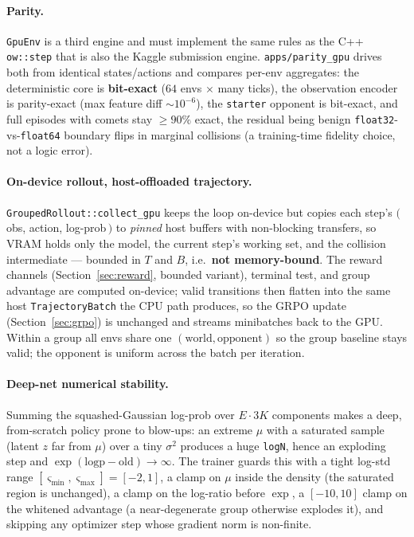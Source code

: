 \documentclass[11pt]{article}
\begin{document}
\paragraph{Parity.} \texttt{GpuEnv} is a third engine and must implement the same rules as the
C++ \texttt{ow::step} that is also the Kaggle submission engine. \texttt{apps/parity\_gpu} drives
both from identical states/actions and compares per-env aggregates: the deterministic core is
\textbf{bit-exact} ($64$ envs $\times$ many ticks), the observation encoder is parity-exact (max
feature diff ${\sim}10^{-6}$), the \texttt{starter} opponent is bit-exact, and full episodes with
comets stay $\ge 90\%$ exact, the residual being benign \texttt{float32}-vs-\texttt{float64}
boundary flips in marginal collisions (a training-time fidelity choice, not a logic error).

\paragraph{On-device rollout, host-offloaded trajectory.} \texttt{GroupedRollout::collect\_gpu}
keeps the loop on-device but copies each step's $(\,$obs, action, log-prob$\,)$ to \emph{pinned} host
buffers with non-blocking transfers, so VRAM holds only the model, the current step's working set,
and the collision intermediate --- bounded in $T$ and $B$, i.e.\ \textbf{not memory-bound}. The
reward channels (Section~\ref{sec:reward}, bounded variant), terminal test, and group advantage are
computed on-device; valid transitions then flatten into the same host \texttt{TrajectoryBatch} the
CPU path produces, so the GRPO update (Section~\ref{sec:grpo}) is unchanged and streams minibatches
back to the GPU. Within a group all envs share one $(\text{world},\text{opponent})$ so the group
baseline stays valid; the opponent is uniform across the batch per iteration.

\paragraph{Deep-net numerical stability.} Summing the squashed-Gaussian log-prob over $E\cdot 3K$
components makes a deep, from-scratch policy prone to blow-ups: an extreme $\mu$ with a saturated
sample (latent $z$ far from $\mu$) over a tiny $\sigma^2$ produces a huge \texttt{logN}, hence an
exploding step and $\exp(\text{logp}-\text{old})\to\infty$. The trainer guards this with a tight
log-std range $[\varsigma_{\min},\varsigma_{\max}]=[-2,1]$, a clamp on $\mu$ inside the density (the
saturated region is unchanged), a clamp on the log-ratio before $\exp$, a $[-10,10]$ clamp on the
whitened advantage (a near-degenerate group otherwise explodes it), and skipping any optimizer step
whose gradient norm is non-finite.
\end{document}
